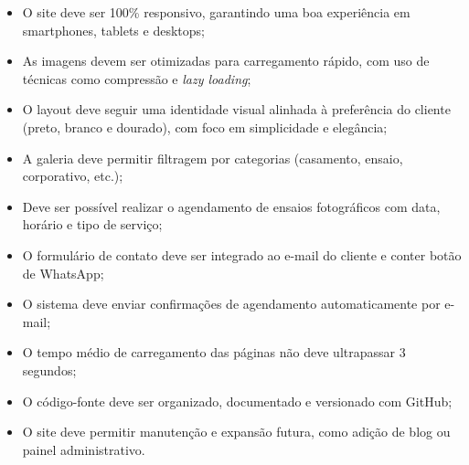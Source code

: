 \begin{itemize}
    \item O site deve ser 100\% responsivo, garantindo uma boa experiência em smartphones, tablets e desktops;
    \item As imagens devem ser otimizadas para carregamento rápido, com uso de técnicas como compressão e \textit{lazy loading};
    \item O layout deve seguir uma identidade visual alinhada à preferência do cliente (preto, branco e dourado), com foco em simplicidade e elegância;
    \item A galeria deve permitir filtragem por categorias (casamento, ensaio, corporativo, etc.);
    \item Deve ser possível realizar o agendamento de ensaios fotográficos com data, horário e tipo de serviço;
    \item O formulário de contato deve ser integrado ao e-mail do cliente e conter botão de WhatsApp;
    \item O sistema deve enviar confirmações de agendamento automaticamente por e-mail;
    \item O tempo médio de carregamento das páginas não deve ultrapassar 3 segundos;
    \item O código-fonte deve ser organizado, documentado e versionado com GitHub;
    \item O site deve permitir manutenção e expansão futura, como adição de blog ou painel administrativo.
\end{itemize}



